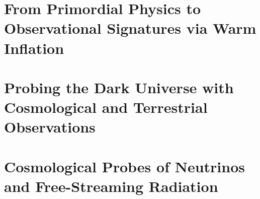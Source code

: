 \part{From Primordial Physics to Observational Signatures via Warm Inflation}
\label{part:warm-inflation}


















\part{Probing the Dark Universe with Cosmological and Terrestrial Observations}
\label{part:dark-universe}














\part{Cosmological Probes of Neutrinos and Free-Streaming Radiation}
\label{part:neutrinos}

